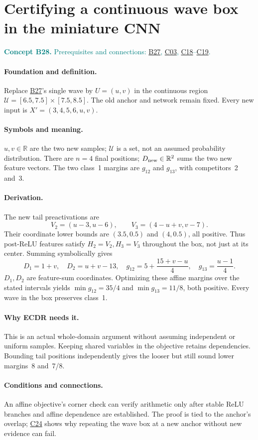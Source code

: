 \documentclass[11pt,a4paper]{article}
\newcommand{\R}{\mathbb R}
\newcommand{\conceptid}{Front matter}
\newcommand{\concept}[3]{\clearpage\renewcommand{\conceptid}{#1}%
\section{#2}\label{concept:#1}%
\textcolor{teal}{\textbf{Concept #1.} Prerequisites and connections: #3.}\par
\typeout{ECDR-CONCEPT-START #1 PAGE=\thepage}}
\begin{document}
\concept{B28}{Certifying a continuous wave box in the miniature CNN}{\hyperref[concept:B27]{B27}, \hyperref[concept:C03]{C03}, \hyperref[concept:C18]{C18}--\hyperref[concept:C19]{C19}}
\paragraph{Foundation and definition.}
Replace \hyperref[concept:B27]{B27}'s single wave by $U=(u,v)$ in the continuous region
$\mathcal U=[6.5,7.5]\times[7.5,8.5]$. The old anchor and network remain
fixed. Every new input is $X'=(3,4,5,6,u,v)$.
\paragraph{Symbols and meaning.}
$u,v\in\R$ are the two new samples; $\mathcal U$ is a set, not an
assumed probability distribution. There are $n=4$ final positions;
$D_{\rm new}\in\R^2$ sums the two new feature vectors.
The two class~1 margins are $g_{12}$ and $g_{13}$, with competitors~2 and~3.
\paragraph{Derivation.}
The new tail preactivations are
\[
 V_2=(u-3,u-6),\qquad V_3=(4-u+v,v-7).
\]
Their coordinate lower bounds are $(3.5,0.5)$ and $(4,0.5)$, all positive.
Thus post-ReLU features satisfy $H_2=V_2,H_3=V_3$ throughout the box,
not just at its center.
Summing symbolically gives
\[
 D_1=1+v,\quad D_2=u+v-13,\quad
 g_{12}=5+\frac{15+v-u}{4},\quad g_{13}=\frac{u-1}{4}.
\]
$D_1,D_2$ are feature-sum coordinates. Optimizing these affine margins
over the stated intervals yields $\min g_{12}=35/4$ and
$\min g_{13}=11/8$, both positive. Every wave in the box preserves class~1.
\paragraph{Why ECDR needs it.}
This is an actual whole-domain argument without assuming independent or
uniform samples. Keeping shared variables in the objective retains
dependencies. Bounding tail positions independently gives the looser but
still sound lower margins~8 and~7/8.
\paragraph{Conditions and connections.}
An affine objective's corner check can verify arithmetic only after stable
ReLU branches and affine dependence are established. The proof is tied to
the anchor's overlap; \hyperref[concept:C24]{C24} shows why repeating the wave box at a new anchor
without new evidence can fail.
\par\label{endconcept:B28}
\end{document}

